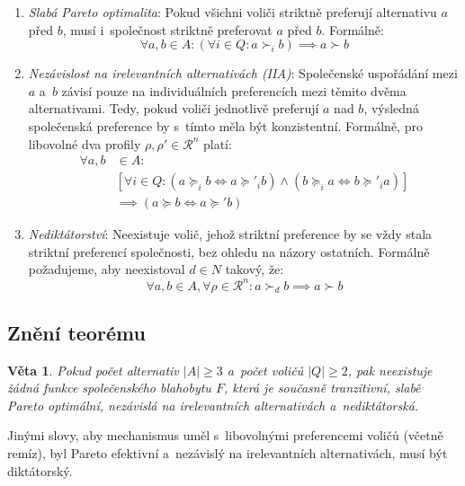 \documentclass[a4paper, 11pt]{article}
\newtheorem{theorem}{Věta}
\begin{document}
\begin{enumerate}
    \item \emph{Slabá Pareto optimalita}: Pokud všichni voliči striktně preferují alternativu $a$ před $b$, musí i~společnost striktně preferovat $a$ před $b$.
          Formálně:
          \[
              \forall a, b \in A \colon (\forall i \in Q \colon a \succ_i b) \implies a \succ b
          \]
    \item \emph{Nezávislost na irelevantních alternativách (IIA)}: Společenské uspořádání mezi $a$ a~$b$ závisí pouze na individuálních preferencích mezi těmito dvěma alternativami.
          Tedy, pokud voliči jednotlivě preferují $a$ nad $b$, výsledná společenská preference by s~tímto měla být konzistentní.
          Formálně, pro libovolné dva profily $\rho, \rho' \in \mathcal{R}^n$ platí:
          \begin{align*}
              \forall a, b & \in A\colon                                                                                                       \\
                           & \left[\forall i \in Q \colon (a \succeq_i b \iff a \succeq'_i b) \land (b \succeq_i a \iff b \succeq'_i a)\right] \\
                           & \implies (a \succeq b \iff a \succeq' b)
          \end{align*}
    \item \emph{Nediktátorství}: Neexistuje volič, jehož striktní preference by se vždy stala striktní preferencí společnosti, bez ohledu na názory ostatních.
          Formálně požadujeme, aby neexistoval $d \in N$ takový, že:
          \[
              \forall a, b \in A, \forall \rho \in \mathcal{R}^n \colon a \succ_d b \implies a \succ b
          \]
\end{enumerate}

\subsection{Znění teorému}

\begin{theorem}
    Pokud počet alternativ $|A| \ge 3$ a~počet voličů $|Q| \ge 2$, pak neexistuje žádná funkce společenského blahobytu $F$, která je současně tranzitivní, slabě Pareto optimální, nezávislá na irelevantních alternativách a~nediktátorská.
\end{theorem}

Jinými slovy, aby mechanismus uměl s~libovolnými preferencemi voličů (včetně remíz), byl Pareto efektivní a~nezávislý na irelevantních alternativách, musí být diktátorský.
\end{document}
